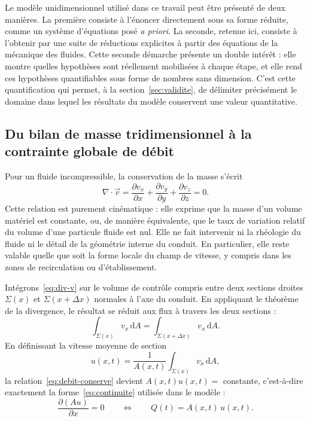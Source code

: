 \documentclass[11pt,a4paper]{report}
\newcommand{\divg}{\nabla\!\cdot\!}
\begin{document}
Le modèle unidimensionnel utilisé dans ce travail peut être présenté de deux manières. La première
consiste à l'énoncer directement sous sa forme réduite, comme un système d'équations posé \emph{a
priori}. La seconde, retenue ici, consiste à l'obtenir par une suite de réductions explicites à partir
des équations de la mécanique des fluides. Cette seconde démarche présente un double intérêt : elle
montre quelles hypothèses sont réellement mobilisées à chaque étape, et elle rend ces hypothèses
quantifiables sous forme de nombres sans dimension. C'est cette quantification qui permet, à la
section~\ref{sec:validite}, de délimiter précisément le domaine dans lequel les résultats du modèle
conservent une valeur quantitative.

\subsection{Du bilan de masse tridimensionnel à la contrainte globale de débit}
\label{sec:div-v}

Pour un fluide incompressible, la conservation de la masse s'écrit
\begin{equation}
\divg\vec{v} = \frac{\partial v_x}{\partial x} + \frac{\partial v_y}{\partial y}
+ \frac{\partial v_z}{\partial z} = 0 .
\label{eq:div-v}
\end{equation}
Cette relation est purement cinématique : elle exprime que la masse d'un volume matériel est constante,
ou, de manière équivalente, que le taux de variation relatif du volume d'une particule fluide est nul.
Elle ne fait intervenir ni la rhéologie du fluide ni le détail de la géométrie interne du conduit. En
particulier, elle reste valable quelle que soit la forme locale du champ de vitesse, y compris dans les
zones de recirculation ou d'établissement.

Intégrons~\eqref{eq:div-v} sur le volume de contrôle compris entre deux sections droites \(\Sigma(x)\) et
\(\Sigma(x+\Delta x)\) normales à l'axe du conduit. En appliquant le théorème de la divergence, le
résultat se réduit aux flux à travers les deux sections :
\begin{equation}
\int_{\Sigma(x)} v_x\,\mathrm{d}A = \int_{\Sigma(x+\Delta x)} v_x\,\mathrm{d}A .
\label{eq:debit-conserve}
\end{equation}
En définissant la vitesse moyenne de section
\begin{equation}
u(x,t) = \frac{1}{A(x,t)}\int_{\Sigma(x)} v_x\,\mathrm{d}A,
\label{eq:def-u}
\end{equation}
la relation~\eqref{eq:debit-conserve} devient \(A(x,t)u(x,t) = \) constante, c'est-à-dire exactement la
forme~\eqref{eq:continuite} utilisée dans le modèle :
\begin{equation}
\frac{\partial (Au)}{\partial x} = 0
\qquad\Longleftrightarrow\qquad
Q(t) = A(x,t)\,u(x,t) .
\label{eq:continuite-reduite}
\end{equation}
\end{document}
